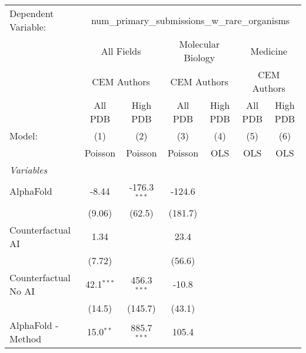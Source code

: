\begingroup
\centering
\begin{tabular}{lcccccc}
   \tabularnewline \midrule \midrule
   Dependent Variable: & \multicolumn{6}{c}{num\_primary\_submissions\_w\_rare\_organisms}\\
 & \multicolumn{2}{c}{All Fields} & \multicolumn{2}{c}{Molecular Biology} & \multicolumn{2}{c}{Medicine} \\
\cmidrule(lr){2-3} \cmidrule(lr){4-5} \cmidrule(lr){6-7}
 & \multicolumn{2}{c}{CEM Authors} & \multicolumn{2}{c}{CEM Authors} & \multicolumn{2}{c}{CEM Authors} \\
\cmidrule(lr){2-3} \cmidrule(lr){4-5} \cmidrule(lr){6-7}
 & \multicolumn{1}{c}{All PDB} & \multicolumn{1}{c}{High PDB} & \multicolumn{1}{c}{All PDB} & \multicolumn{1}{c}{High PDB} & \multicolumn{1}{c}{All PDB} & \multicolumn{1}{c}{High PDB} \\
\cmidrule(lr){2-2} \cmidrule(lr){3-3} \cmidrule(lr){4-4} \cmidrule(lr){5-5} \cmidrule(lr){6-6} \cmidrule(lr){7-7}
   Model:                                                     & (1)            & (2)            & (3)     & (4)  & (5)  & (6)\\  
                                                              &  Poisson       & Poisson        & Poisson & OLS  & OLS  & OLS\\  
   \midrule
   \emph{Variables}\\
   AlphaFold                                                  & -8.44          & -176.3$^{***}$ & -124.6  &      &      &   \\   
                                                              & (9.06)         & (62.5)         & (181.7) &      &      &   \\   
   Counterfactual AI                                          & 1.34           &                & 23.4    &      &      &   \\   
                                                              & (7.72)         &                & (56.6)  &      &      &   \\   
   Counterfactual No AI                                       & 42.1$^{***}$   & 456.3$^{***}$  & -10.8   &      &      &   \\   
                                                              & (14.5)         & (145.7)        & (43.1)  &      &      &   \\   
   AlphaFold - Method                                         & 15.0$^{**}$    & 885.7$^{***}$  & 105.4   &      &      &   \\   

\end{tabular}
